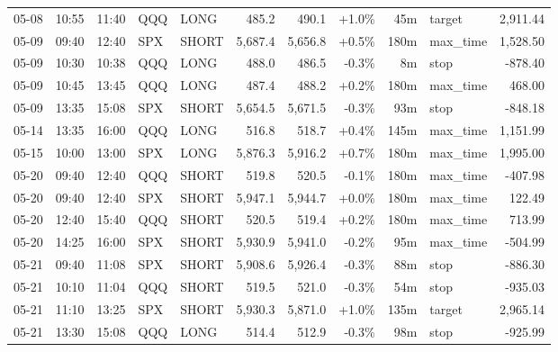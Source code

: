 \documentclass[11pt,a4paper,twoside]{article}
\begin{document}
\begin{center}
\begin{longtable}{>{\color{txtmain}}l l l l l r r r r >{\color{txtmain}}l r}
05-08 & 10:55 & 11:40 & QQQ & LONG & 485.2 & 490.1 & \textcolor{wingreen}{+1.0\%} & 45m & target & \textcolor{wingreen}{2,911.44} \\
05-09 & 09:40 & 12:40 & SPX & SHORT & 5,687.4 & 5,656.8 & \textcolor{wingreen}{+0.5\%} & 180m & max\_time & \textcolor{wingreen}{1,528.50} \\
05-09 & 10:30 & 10:38 & QQQ & LONG & 488.0 & 486.5 & \textcolor{lossred}{-0.3\%} & 8m & stop & \textcolor{lossred}{-878.40} \\
05-09 & 10:45 & 13:45 & QQQ & LONG & 487.4 & 488.2 & \textcolor{wingreen}{+0.2\%} & 180m & max\_time & \textcolor{wingreen}{468.00} \\
05-09 & 13:35 & 15:08 & SPX & SHORT & 5,654.5 & 5,671.5 & \textcolor{lossred}{-0.3\%} & 93m & stop & \textcolor{lossred}{-848.18} \\
05-14 & 13:35 & 16:00 & QQQ & LONG & 516.8 & 518.7 & \textcolor{wingreen}{+0.4\%} & 145m & max\_time & \textcolor{wingreen}{1,151.99} \\
05-15 & 10:00 & 13:00 & SPX & LONG & 5,876.3 & 5,916.2 & \textcolor{wingreen}{+0.7\%} & 180m & max\_time & \textcolor{wingreen}{1,995.00} \\
05-20 & 09:40 & 12:40 & QQQ & SHORT & 519.8 & 520.5 & \textcolor{lossred}{-0.1\%} & 180m & max\_time & \textcolor{lossred}{-407.98} \\
05-20 & 09:40 & 12:40 & SPX & SHORT & 5,947.1 & 5,944.7 & \textcolor{wingreen}{+0.0\%} & 180m & max\_time & \textcolor{wingreen}{122.49} \\
05-20 & 12:40 & 15:40 & QQQ & SHORT & 520.5 & 519.4 & \textcolor{wingreen}{+0.2\%} & 180m & max\_time & \textcolor{wingreen}{713.99} \\
05-20 & 14:25 & 16:00 & SPX & SHORT & 5,930.9 & 5,941.0 & \textcolor{lossred}{-0.2\%} & 95m & max\_time & \textcolor{lossred}{-504.99} \\
05-21 & 09:40 & 11:08 & SPX & SHORT & 5,908.6 & 5,926.4 & \textcolor{lossred}{-0.3\%} & 88m & stop & \textcolor{lossred}{-886.30} \\
05-21 & 10:10 & 11:04 & QQQ & SHORT & 519.5 & 521.0 & \textcolor{lossred}{-0.3\%} & 54m & stop & \textcolor{lossred}{-935.03} \\
05-21 & 11:10 & 13:25 & SPX & SHORT & 5,930.3 & 5,871.0 & \textcolor{wingreen}{+1.0\%} & 135m & target & \textcolor{wingreen}{2,965.14} \\
05-21 & 13:30 & 15:08 & QQQ & LONG & 514.4 & 512.9 & \textcolor{lossred}{-0.3\%} & 98m & stop & \textcolor{lossred}{-925.99} \\

\end{longtable}
\end{center}
\end{document}
